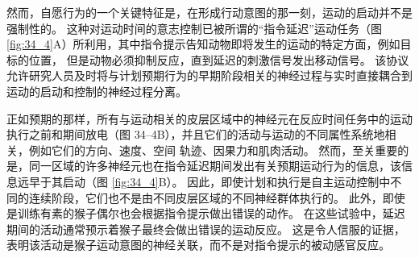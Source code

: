 然而，自愿行为的一个关键特征是，在形成行动意图的那一刻，运动的启动并不是强制性的。 这种对运动时间的意志控制已被所谓的“指令延迟”运动任务（图 \ref{fig:34_4}A）所利用，其中指令提示告知动物即将发生的运动的特定方面，例如目标的位置， 但是动物必须抑制反应，直到延迟的刺激信号发出移动信号。 该协议允许研究人员及时将与计划预期行为的早期阶段相关的神经过程与实时直接耦合到运动的启动和控制的神经过程分离。

正如预期的那样，所有与运动相关的皮层区域中的神经元在反应时间任务中的运动执行之前和期间放电（图 34–4B），并且它们的活动与运动的不同属性系统地相关，例如它们的方向、速度、空间 轨迹、因果力和肌肉活动。 然而，至关重要的是，同一区域的许多神经元也在指令延迟期间发出有关预期运动行为的信息，该信息远早于其启动（图 \ref{fig:34_4}B）。 因此，即使计划和执行是自主运动控制中不同的连续阶段，它们也不是由不同皮层区域的不同神经群体执行的。 此外，即使是训练有素的猴子偶尔也会根据指令提示做出错误的动作。 在这些试验中，延迟期间的活动通常预示着猴子最终会做出错误的运动反应。 这是令人信服的证据，表明该活动是猴子运动意图的神经关联，而不是对指令提示的被动感官反应。

